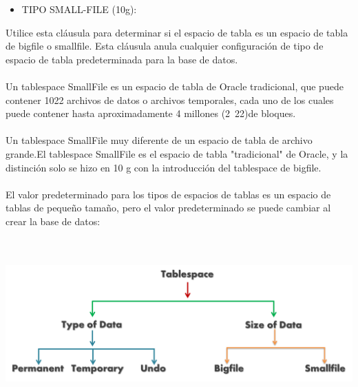 \begin{itemize}
	\item TIPO SMALL-FILE (10g):
\end{itemize}
\begin{adjustwidth}{0.40in}{0.0in}
	Utilice esta cláusula para determinar si el espacio de tabla es un espacio de tabla de bigfile o smallfile. Esta cláusula anula cualquier configuración de tipo de espacio de tabla predeterminada para la base de datos.\\ \\		
	Un tablespace SmallFile es un espacio de tabla de Oracle tradicional, que puede contener 1022 archivos de datos o archivos temporales, cada uno de los cuales puede contener hasta aproximadamente 4 millones (2~22)de bloques.\\ \\	
	Un tablespace SmallFile muy diferente de un espacio de tabla de archivo grande.El tablespace SmallFile es el espacio de tabla "tradicional" de Oracle, y la distinción solo se hizo en 10 g con la introducción del tablespace de bigfile.\\ \\	
	El valor predeterminado para los tipos de espacios de tablas es un espacio de tablas de pequeño tamaño, pero el valor predeterminado se puede cambiar al crear la base de datos:\\\\
\\
	\begin{center}
		\includegraphics[width=15.3cm]{./Imagenes/5}
	\end{center}
\end{adjustwidth}

\vspace{\baselineskip}

